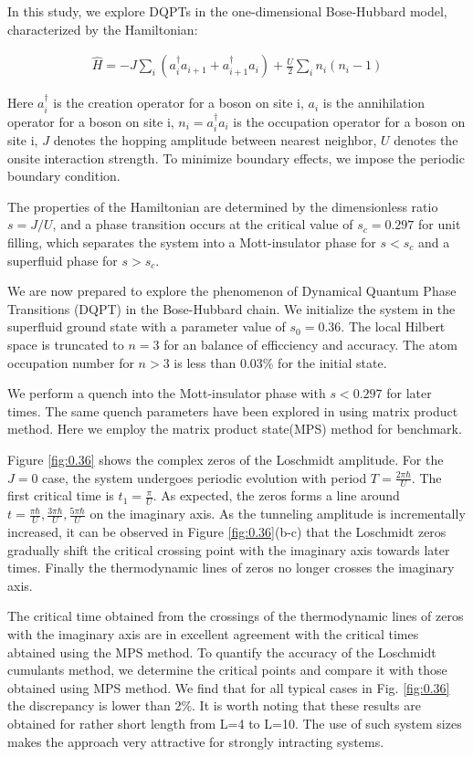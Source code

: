 \documentclass[%
reprint,
superscriptaddress,
amsmath,amssymb,
aps,
pra,
floatfix,
]{revtex4-1}
\begin{document}
In this study, we explore DQPTs in the one-dimensional Bose-Hubbard model, characterized by the Hamiltonian:

\begin{align}
	\hat{H} = -J \sum_i (a_{i}^{\dagger} a_{i+1} + a_{i+1}^{\dagger} a_{i}) + \frac{U}{2} \sum_{i} n_{i}(n_{i}-1) \label{eqn:bhm}
\end{align}

Here $a_i^{\dagger}$ is the creation operator for a boson on site i, $a_i$ is the annihilation operator for a boson on site i, $n_i=a_i^{\dagger}a_i$ is the occupation operator for a boson on site i, $J$ denotes the hopping amplitude between nearest neighbor, $U$ denotes the onsite interaction strength. To minimize boundary effects, we impose the periodic boundary condition.

The properties of the Hamiltonian are determined by the dimensionless ratio $s=J/U$, and a phase transition occurs at the critical value of $s_c=0.297$ for unit filling, which separates the system into a Mott-insulator phase for $s<s_c$ and a superfluid phase for $s>s_c$.


We are now prepared to explore the phenomenon of Dynamical Quantum Phase Transitions (DQPT) in the Bose-Hubbard chain. We initialize the system in the superfluid ground state with a parameter value of $s_0=0.36$. The local Hilbert space is truncated to $n=3$ for an balance of efficciency and accuracy. The atom occupation number for $n>3$ is less than 0.03\% for the initial state.

We perform a quench into the Mott-insulator phase with $s<0.297$ for later times. The same quench parameters have been explored in \cite{lacki2019} using matrix product method. Here we employ the matrix product state(MPS) method for benchmark.

Figure \ref{fig:0.36} shows the complex zeros of the Loschmidt amplitude. 
 For the $J=0$ case, the system undergoes periodic evolution with period $T=\frac{2\pi\hbar}{U}$. The first critical time is $t_1=\frac{\pi}{U}$. As expected, the zeros forms a line around $t=\frac{\pi\hbar}{U},\frac{3\pi\hbar}{U},\frac{5\pi\hbar}{U}$ on the imaginary axis.
As the tunneling amplitude is incrementally increased, it can be observed in Figure \ref{fig:0.36}(b-c) that the Loschmidt zeros gradually shift the critical crossing point with the imaginary axis towards later times. Finally the thermodynamic lines of zeros no longer crosses the imaginary axis.

The critical time obtained from the crossings of the thermodynamic lines of zeros with the imaginary axis are in excellent agreement with the critical times abtained using the MPS method. To quantify the accuracy of the Loschmidt cumulants method, we determine the critical points and compare it with those obtained using MPS method. We find that for all typical cases in Fig. \ref{fig:0.36} the discrepancy is lower than 2\%. It is worth noting that these results are obtained for rather short length from L=4 to L=10. The use of such system sizes makes the approach very attractive for strongly intracting systems.
\end{document}

